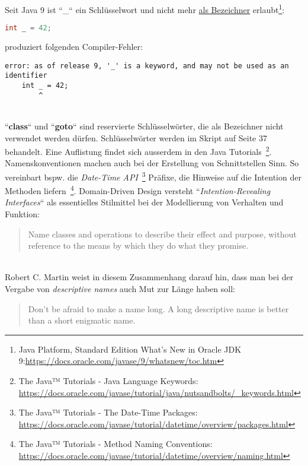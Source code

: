 Seit Java 9 ist ``\_`` ein Schlüsselwort und nicht mehr \underline{als Bezeichner} erlaubt\footnote{
    Java Platform, Standard Edition What’s New in Oracle JDK 9:\url{https://docs.oracle.com/javase/9/whatsnew/toc.htm}
}:

\begin{lstlisting}[language=java]
int _ = 42;
\end{lstlisting}

produziert folgenden Compiler-Fehler:

\begin{lstlisting}[language=text]
error: as of release 9, '_' is a keyword, and may not be used as an identifier
    int _ = 42;
        ^
\end{lstlisting}\\



``\textbf{class}`` und ``\textbf{goto}`` sind reservierte Schlüsselwörter, die als Bezeichner nicht verwendet werden dürfen.
Schlüsselwörter werden im Skript auf Seite 37 behandelt.
Eine Auflistung findet sich ausserdem in den Java Tutorials~\footnote{
    The Java™ Tutorials - Java Language Keywords: \url{https://docs.oracle.com/javase/tutorial/java/nutsandbolts/\_keywords.html}
}.\\

Namenskonventionen machen auch bei der Erstellung von Schnittstellen Sinn.
So vereinbart bspw. die \textit{Date-Time API}~\footnote{
    The Java™ Tutorials - The Date-Time Packages: \url{https://docs.oracle.com/javase/tutorial/datetime/overview/packages.html}
}
Präfixe, die Hinweise auf die Intention der Methoden liefern~\footnote{
    The Java™ Tutorials - Method Naming Conventions: \url{https://docs.oracle.com/javase/tutorial/datetime/overview/naming.html}
}.
Domain-Driven Design\cite{Eva04} versteht ``\textit{Intention-Revealing Interfaces}`` als essentielles Stilmittel bei
der Modellierung von Verhalten und Funktion:

    \blockquote[{\cite[247]{Eva04}}]{
        Name classes and operations to describe their effect and purpose, without reference to the means by which they do what they promise.
    }\\

Robert C. Martin weist in diesem Zusammenhang darauf hin, dass man bei der Vergabe von \textit{descriptive names} auch Mut zur
Länge haben soll:

    \blockquote[{\cite[39]{Mar08}}]{
        Don't be afraid to make a name long. A long descriptive name is better than a short enigmatic name.
    }.




